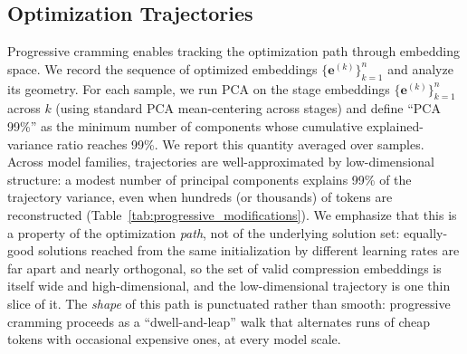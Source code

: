 \documentclass{article}
\theoremstyle{plain}
\theoremstyle{definition}
\theoremstyle{remark}
\begin{document}
\begin{table}[]
    \centering
    \caption{Full vs. progressive cramming on PG19 (mean $\pm$ std over samples). ``Full'' cramming \cite{kuratov2025cramming} uses a fixed token budget and may stop below perfect Teacher Forcing (TF) reconstruction; progressive cramming fixes reconstruction at 100\% and guarantees perfect reconstruction under autoregressive greedy generation.}
    \label{tab:full_vs_progressive}

    \begin{small}
    
    \end{small}

\end{table}


\begin{table}[]
    \centering
    \caption{Progressive cramming variants across model families: baseline progressive cramming vs.\ low-dimensional projection only (``dim'').}
    \label{tab:progressive_modifications}

    \begin{small}
    
    \end{small}

\end{table}


\subsection{Optimization Trajectories}
\label{sec:trajectory}

Progressive cramming enables tracking the optimization path through embedding space.
We record the sequence of optimized embeddings $\{\mathbf{e}^{(k)}\}_{k=1}^{n}$ and analyze its geometry.
For each sample, we run PCA on the stage embeddings $\{\mathbf{e}^{(k)}\}_{k=1}^{n}$ across $k$ (using standard PCA mean-centering across stages) and define ``PCA 99\%'' as the minimum number of components whose cumulative explained-variance ratio reaches 99\%.
We report this quantity averaged over samples.
Across model families, trajectories are well-approximated by low-dimensional structure: a modest number of principal components explains 99\% of the trajectory variance, even when hundreds (or thousands) of tokens are reconstructed (Table~\ref{tab:progressive_modifications}).
We emphasize that this is a property of the optimization \emph{path}, not of the underlying solution set: equally-good solutions reached from the same initialization by different learning rates are far apart and nearly orthogonal, so the set of valid compression embeddings is itself wide and high-dimensional, and the low-dimensional trajectory is one thin slice of it.
The \emph{shape} of this path is punctuated rather than smooth: progressive cramming proceeds as a ``dwell-and-leap'' walk that alternates runs of cheap tokens with occasional expensive ones, at every model scale.
\end{document}

